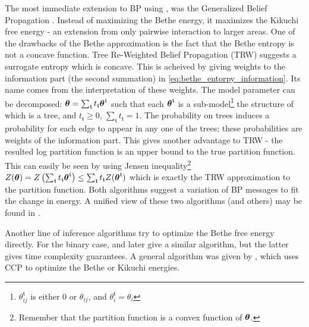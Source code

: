 The most immediate extension to BP using , was the Generalized Belief Propagation \cite{yedidia2000generalized}. 
Instead of maximizing the Bethe energy, it maximizes the Kikuchi free energy - an extension from only pairwise interaction to larger areas.
One of the drawbacks of the Bethe approximation is the fact that the Bethe entropy is not a concave function.
Tree Re-Weighted Belief Propagation (TRW) \cite{wainwright2003tree} suggests a surrogate entropy which is concave.
This is acheived by giving weights to the information part (the second summation) in \eqref{eq:bethe_entorpy_information}.
Its name comes from the interpretation of these weights.
The model parameter can be decomposed: $\boldsymbol{\theta}=\sum_{\mathfrak{t}} t_{\mathfrak{t}}\boldsymbol{\theta}^{\mathfrak{t}}$ such that each $\boldsymbol{\theta}^{\mathfrak{t}}$ is a sub-model\footnote{$\theta^{\mathfrak{t}}_{ij}$ is either $0$ or $\theta_{ij}$, and $\theta^{\mathfrak{t}}_i =\theta_i$} the structure of which is a tree, and $t_{\mathfrak{t}}\geq 0$, $\sum_{\mathfrak{t}} t_{\mathfrak{t}} = 1$.
The probability on trees induces a probability for each edge to appear in any one of the trees;
these probabilities are weights of the information part.
This gives another advantage to TRW - the resulted log partition function is an upper bound to the true partition function. 
This can easily be seen by using Jensen inequality\footnote{Remember that the partition function is a convex function of $\boldsymbol{\theta}$.} $Z(\boldsymbol{\theta}) = Z\left(\sum_{\mathfrak{t}} t_{\mathfrak{t}}\boldsymbol{\theta}^{\mathfrak{t}}\right) \leq \sum_{\mathfrak{t}} t_{\mathfrak{t}} Z(\boldsymbol{\theta}^{\mathfrak{t}})$ which is exactly the TRW approximation to the partition function.
Both algorithms suggest a variation of BP messages to fit the change in energy.
A unified view of these two algorithms (and others) may be found in \cite{meshi2009convexifying}.

Another line of inference algorithms try to optimize the Bethe free energy directly.
For the binary case, \cite{welling2001belief} and later \cite{shin2012complexity} give a similar algorithm, but the latter gives time complexity guarantees.
A general algorithm was given by \cite{yuille2002cccp}, which uses CCP\cite{yuille2002concave} to optimize the Bethe or Kikuchi energies.

